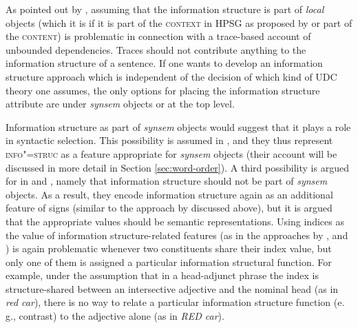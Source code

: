 \documentclass[output=paper]{langsci/langscibook}
\begin{document}
As pointed out by \cite{deKuthy2002a}, assuming that the information
structure is part of \textit{local} objects (which it is if it is part
of the \textsc{context} in HPSG as proposed by \citealt{EV96a} or part of
the \textsc{content}) is problematic in connection with a trace-based
account of unbounded dependencies.  Traces should not contribute
anything to the information structure of a sentence.  If one wants to
develop an information structure approach which is independent of the
decision of which kind of UDC theory one assumes, the only options for
placing the information structure attribute are under \textit{synsem}
objects or at the top level.

Information structure as part of \textit{synsem} objects would suggest
that it plays a role in syntactic selection. This possibility is
assumed in \cite{BC2011b}, and they thus represent
\textsc{info"=struc} as a feature appropriate for \textit{synsem}
objects (their account will be discussed in more detail in Section
\ref{sec:word-order}).  A third possibility is argued for in
\cite{deKuthy2002a} and \cite{Bildhauer2008a}, namely that information
structure should not be part of \textit{synsem} objects. As a result,
they encode information structure again as an additional feature of
signs (similar to the approach by \citealt{Mandahar94a-u} discussed above), but
it is argued that the appropriate values should be semantic
representations. Using indices as the value of information
structure-related features (as in the approaches by
\citealt{Paggio2009a-u}, \citealt{song-bender:2012} and \citealt{song2018}) is again
problematic whenever two constituents share their index value, but
only one of them is assigned a particular information structural
function. For example, under the assumption that in a head-adjunct
phrase the index is structure-shared between an intersective adjective
and the nominal head (as in \textit{red car}), there is no way to
relate a particular information structure function (e. g., contrast) to the adjective
alone (as in \textit{RED car}).
\end{document}
